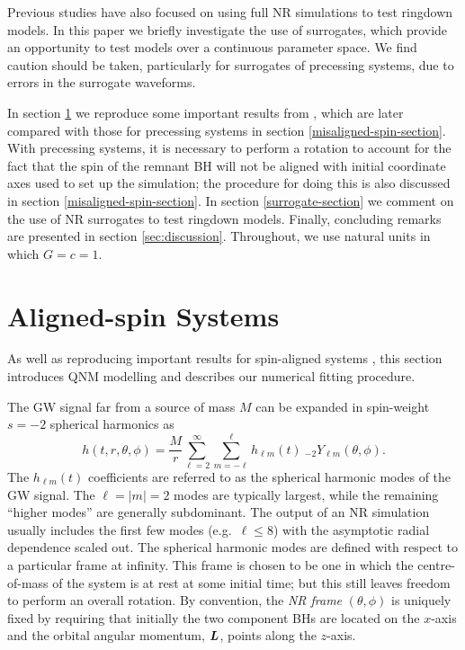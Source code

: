 Previous studies have also focused on using full NR simulations to test ringdown models. 
In this paper we briefly investigate the use of surrogates, which provide an opportunity to test models over a continuous parameter space. 
We find caution should be taken, particularly for surrogates of precessing systems, due to errors in the surrogate waveforms.

In section \ref{aligned-spin-section} we reproduce some important results from \cite{overtones, mirror_modes}, which are later compared with those for precessing systems in section \ref{misaligned-spin-section}. 
With precessing systems, it is necessary to perform a rotation to account for the fact that the spin of the remnant BH will not be aligned with initial coordinate axes used to set up the simulation; the procedure for doing this is also discussed in section \ref{misaligned-spin-section}. 
In section \ref{surrogate-section} we comment on the use of NR surrogates to test ringdown models. 
Finally, concluding remarks are presented in section \ref{sec:discussion}. 
Throughout, we use natural units in which $G=c=1$.

\section{Aligned-spin Systems}\label{aligned-spin-section}

As well as reproducing important results for spin-aligned systems \cite{overtones, mirror_modes}, this section introduces QNM modelling and describes our numerical fitting procedure. 

The GW signal far from a source of mass $M$ can be expanded in spin-weight $s=-2$ spherical harmonics as
\begin{equation}\label{YlmExpansion}
    h(t,r,\theta,\phi) = \frac{M}{r} \sum_{\ell = 2}^{\infty} \sum_{m = -\ell}^{\ell} h_{\ell m}(t) ~ {}_{-2}Y_{\ell m}(\theta, \phi).
\end{equation}
The $h_{\ell m}(t)$ coefficients are referred to as the spherical harmonic modes of the GW signal.
The ${\ell=|m|=2}$ modes are typically largest, while the remaining ``higher modes'' are generally subdominant.
The output of an NR simulation usually includes the first few modes (e.g.\ $\ell \leq 8$) with the asymptotic radial dependence scaled out.
The spherical harmonic modes are defined with respect to a particular frame at infinity.
This frame is chosen to be one in which the centre-of-mass of the system is at rest at some initial time; but this still leaves freedom to perform an overall rotation.
By convention, the \emph{NR frame} $(\theta,\phi)$ is uniquely fixed by requiring that initially the two component BHs are located on the $x$-axis and the orbital angular momentum, $\vb*{L}$, points along the $z$-axis.

